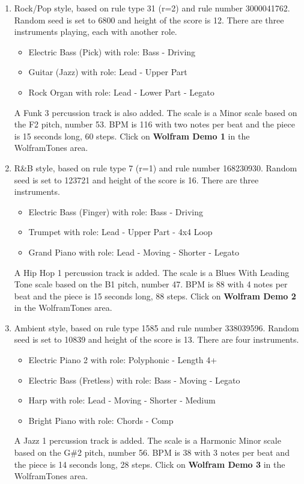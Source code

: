 \documentclass[12pt]{article}
\begin{document}
\begin{enumerate}
\item Rock/Pop style, based on rule type 31 (r=2) and rule number 3000041762. Random seed is set to 6800 and height of the score is 12. There are three instruments playing, each with another role.
\begin{itemize}
\item Electric Bass (Pick) with role: Bass - Driving
\item Guitar (Jazz) with role: Lead - Upper Part
\item Rock Organ with role: Lead - Lower Part - Legato 
\end{itemize}
A Funk 3 percussion track is also added. The scale is a Minor scale based on the F2 pitch, number 53. BPM is 116 with two notes per beat and the piece is 15 seconds long, 60 steps. Click on \textbf{Wolfram Demo 1} in the WolframTones area.

\item R\&B style, based on rule type 7 (r=1) and rule number 168230930. Random seed is set to 123721 and height of the score is 16.
There are three instruments.
\begin{itemize}
\item Electric Bass (Finger) with role: Bass - Driving
\item Trumpet with role: Lead - Upper Part - 4x4 Loop
\item Grand Piano with role: Lead - Moving - Shorter - Legato 
\end{itemize}
A Hip Hop 1 percussion track is added. The scale is a Blues With Leading Tone scale based on the B1 pitch, number 47. BPM is 88 with 4 notes per beat and the piece is 15 seconds long, 88 steps. Click on \textbf{Wolfram Demo 2} in the WolframTones area.

\item Ambient style, based on rule type 1585 and rule number 338039596. Random seed is set to 10839 and height of the score is 13.
There are four instruments.
\begin{itemize}
\item Electric Piano 2 with role: Polyphonic - Length 4+
\item Electric Bass (Fretless) with role: Bass - Moving - Legato
\item Harp with role: Lead - Moving - Shorter - Medium
\item Bright Piano with role: Chords - Comp
\end{itemize}
A Jazz 1 percussion track is added. The scale is a Harmonic Minor scale based on the G\#2 pitch, number 56. BPM is 38 with 3 notes per beat and the piece is 14 seconds long, 28 steps. Click on \textbf{Wolfram Demo 3} in the WolframTones area.
\end{enumerate}
\end{document}
